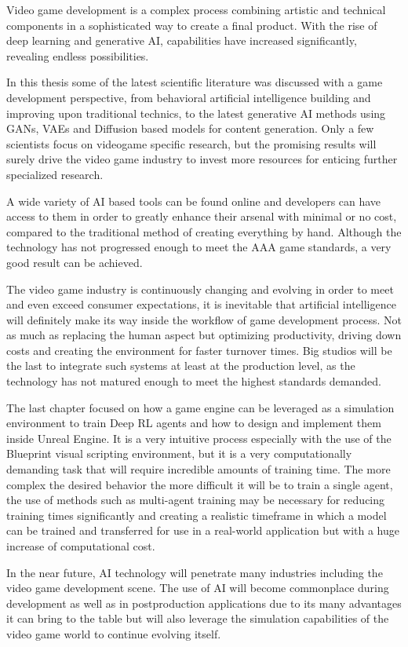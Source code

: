 \documentclass[a4paper,one side,12pt]{book}
\begin{document}
Video game development is a complex process combining artistic and
technical components in a sophisticated way to create a final product.
With the rise of deep learning and generative AI, capabilities have
increased significantly, revealing endless possibilities.

In this thesis some of the latest scientific literature was discussed
with a game development perspective, from behavioral artificial
intelligence building and improving upon traditional technics, to the
latest generative AI methods using GANs, VAEs and Diffusion based models
for content generation. Only a few scientists focus on videogame
specific research, but the promising results will surely drive the video
game industry to invest more resources for enticing further specialized
research.

A wide variety of AI based tools can be found online and developers can
have access to them in order to greatly enhance their arsenal with
minimal or no cost, compared to the traditional method of creating
everything by hand. Although the technology has not progressed enough to
meet the AAA game standards, a very good result can be achieved.

The video game industry is continuously changing and evolving in order
to meet and even exceed consumer expectations, it is inevitable that
artificial intelligence will definitely make its way inside the workflow
of game development process. Not as much as replacing the human aspect
but optimizing productivity, driving down costs and creating the
environment for faster turnover times. Big studios will be the last to
integrate such systems at least at the production level, as the
technology has not matured enough to meet the highest standards
demanded.

The last chapter focused on how a game engine can be leveraged as a
simulation environment to train Deep RL agents and how to design and
implement them inside Unreal Engine. It is a very intuitive process
especially with the use of the Blueprint visual scripting environment,
but it is a very computationally demanding task that will require
incredible amounts of training time. The more complex the desired
behavior the more difficult it will be to train a single agent, the use
of methods such as multi-agent training may be necessary for reducing
training times significantly and creating a realistic timeframe in which
a model can be trained and transferred for use in a real-world
application but with a huge increase of computational cost.

In the near future, AI technology will penetrate many industries
including the video game development scene. The use of AI will become
commonplace during development as well as in postproduction applications
due to its many advantages it can bring to the table but will also
leverage the simulation capabilities of the video game world to continue
evolving itself.

\pagebreak

\printbibliography[heading=bibintoc,title={BIBLIOGRAPHY}]
\end{document}
